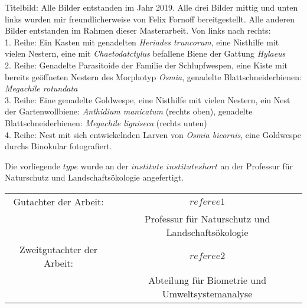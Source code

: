 \documentclass[a4paper,11pt]{article}
\newcommand{\thesistype}{$type$}
\begin{document}
	\begin{scriptsize}
		Titelbild: Alle Bilder entstanden im Jahr 2019. Alle drei Bilder mittig und unten links wurden mir freundlicherweise von Felix Fornoff bereitgestellt. Alle anderen Bilder entstanden im Rahmen dieser Masterarbeit. Von links nach rechts:\\
		1. Reihe: Ein Kasten mit genadelten \textit{Heriades truncorum}, eine Nisthilfe mit vielen Nestern, eine mit \textit{Chaetodatctylus} befallene Biene der Gattung \textit{Hylaeus}\\
		2. Reihe: Genadelte Parasitoide der Familie der Schlupfwespen, eine Kiste mit bereits geöffneten Nestern des Morphotyp \textit{Osmia}, genadelte Blattschneiderbienen: \textit{Megachile rotundata}\\
		3. Reihe: Eine genadelte Goldwespe, eine Nisthilfe mit vielen Nestern, ein Nest der Gartenwollbiene: \textit{Anthidium manicatum} (rechts oben), genadelte Blattschneiderbienen: \textit{Megachile ligniseca} (rechts unten)\\
		4. Reihe: Nest mit sich entwickelnden Larven von \textit{Osmia bicornis}, eine Goldwespe durchs Binokular fotografiert.\\
	\end{scriptsize}
	
	
	\vspace*{\fill}
	
	
	Die vorliegende \thesistype{} wurde an der $institute$ $instituteshort$ an der Professur für Naturschutz und Landschaftsökologie angefertigt. 
	
	
	
	
	\vspace{3cm}
	
	\begin{tabular}{ c c }
		Gutachter der Arbeit:       &  $referee1$ \\
		&  Professur für Naturschutz und Landschaftsökologie    \\
		Zweitgutachter der Arbeit:  &  $referee2$ \\
		&  Abteilung für Biometrie und Umweltsystemanalyse \\
	\end{tabular}
	
	
	
	\newpage
	
	
	\pagebreak
	\thispagestyle{empty}
	\null
	\newpage
	
\end{document}
